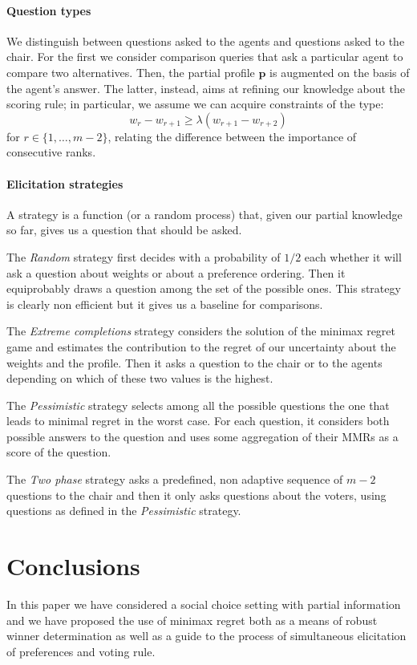 \documentclass[a4paper,twoside]{article}
\newcommand{\pprofile}{{\bm{p}}}%
\newcommand{\strat}[1]{\emph{#1}}
\begin{document}
\paragraph{Question types}
We distinguish between questions asked to the agents and questions asked to the chair.
For the first we consider comparison queries that ask a particular agent to compare two alternatives. Then, the partial profile $\pprofile$ is augmented on the basis of the agent's answer.
The latter, instead, aims at refining our knowledge about the scoring rule; in particular, we assume we can acquire constraints of the type:
\[ w_{r} - w_{r+1} \geq \lambda (w_{r+1} - w_{r+2}) \] 
for $r \in \{1,\ldots,m-2\}$, relating the difference between the importance of consecutive ranks.

\paragraph{Elicitation strategies}
A strategy is a function (or a random process) that, given our partial knowledge so far, gives us a question that should be asked. 

The \strat{Random} strategy first decides with a probability of $1/2$ each whether it will ask a question about weights or about a preference ordering. Then it equiprobably draws a question among the set of the possible ones. This strategy is clearly non efficient but it gives us a baseline for comparisons.

The \strat{Extreme completions} strategy considers the solution of the minimax regret game and estimates the contribution to the regret of our uncertainty about the weights and the profile. Then it asks a question to the chair or to the agents depending on which of these two values is the highest.

The \strat{Pessimistic} strategy selects among all the possible questions the one that leads to minimal regret in the worst case. For each question, it considers both possible answers to the question and uses some aggregation of their MMRs as a score of the question. 

The \strat{Two phase} strategy asks a predefined, non adaptive sequence of $m-2$ questions to the chair and then it only asks questions about the voters, using questions as defined in the \strat{Pessimistic} strategy.

\section{Conclusions}  
\label{sec:conclusions}
In this paper we have considered a social choice setting with partial information and we have proposed the use of minimax regret both as a means of robust winner determination as well as a guide to the process of simultaneous elicitation of preferences and voting rule.
\end{document}
